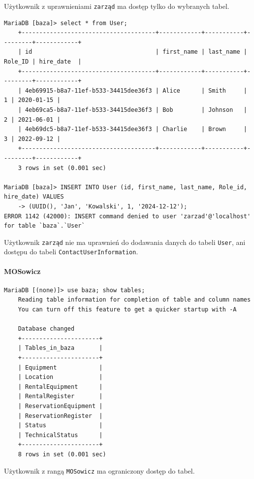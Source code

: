 \documentclass{article}
\begin{document}
Użytkownik z uprawnieniami \texttt{zarząd} ma dostęp tylko do wybranych tabel.

\begin{verbatim}
MariaDB [baza]> select * from User;
    +--------------------------------------+------------+-----------+---------+------------+
    | id                                   | first_name | last_name | Role_ID | hire_date  |
    +--------------------------------------+------------+-----------+---------+------------+
    | 4eb69915-b8a7-11ef-b533-34415dee36f3 | Alice      | Smith     |       1 | 2020-01-15 |
    | 4eb69ca5-b8a7-11ef-b533-34415dee36f3 | Bob        | Johnson   |       2 | 2021-06-01 |
    | 4eb69dc5-b8a7-11ef-b533-34415dee36f3 | Charlie    | Brown     |       3 | 2022-09-12 |
    +--------------------------------------+------------+-----------+---------+------------+
    3 rows in set (0.001 sec)

MariaDB [baza]> INSERT INTO User (id, first_name, last_name, Role_id, hire_date) VALUES
    -> (UUID(), 'Jan', 'Kowalski', 1, '2024-12-12');
ERROR 1142 (42000): INSERT command denied to user 'zarzad'@'localhost' for table `baza`.`User`
\end{verbatim}

Użytkownik \texttt{zarząd} nie ma uprawnień do dodawania danych do tabeli \texttt{User}, ani dostępu do tabeli \texttt{ContactUserInformation}.

\paragraph{MOSowicz}
\begin{verbatim}
MariaDB [(none)]> use baza; show tables;
    Reading table information for completion of table and column names
    You can turn off this feature to get a quicker startup with -A
    
    Database changed
    +----------------------+
    | Tables_in_baza       |
    +----------------------+
    | Equipment            |
    | Location             |
    | RentalEquipment      |
    | RentalRegister       |
    | ReservationEquipment |
    | ReservationRegister  |
    | Status               |
    | TechnicalStatus      |
    +----------------------+
    8 rows in set (0.001 sec)
\end{verbatim}

Użytkownik z rangą \texttt{MOSowicz} ma ograniczony dostęp do tabel.
\end{document}
